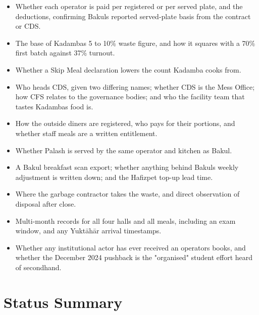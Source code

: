 \documentclass[
  10pt,
  table]{article}
\providecommand{\tightlist}{%
  \setlength{\itemsep}{0pt}\setlength{\parskip}{0pt}}
\renewcommand{\tightlist}{\setlength{\itemsep}{1.5pt}\setlength{\parskip}{0pt}}
\begin{document}
\begin{itemize}
\tightlist
\item
  Whether each operator is paid per registered or per served plate, and the deductions, confirming Bakul\textquotesingle s reported served-plate basis from the contract or CDS.
\item
  The base of Kadamba\textquotesingle s 5 to 10\% waste figure, and how it squares with a 70\% first batch against 37\% turnout.
\item
  Whether a Skip Meal declaration lowers the count Kadamba cooks from.
\item
  Who heads CDS, given two differing names; whether CDS is the Mess Office; how CFS relates to the governance bodies; and who the facility team that tastes Kadamba\textquotesingle s food is.
\item
  How the outside diners are registered, who pays for their portions, and whether staff meals are a written entitlement.
\item
  Whether Palash is served by the same operator and kitchen as Bakul.
\item
  A Bakul breakfast scan export; whether anything behind Bakul\textquotesingle s weekly adjustment is written down; and the Hafizpet top-up lead time.
\item
  Where the garbage contractor takes the waste, and direct observation of disposal after close.
\item
  Multi-month records for all four halls and all meals, including an exam window, and any Yuktāhār arrival timestamps.
\item
  Whether any institutional actor has ever received an operator\textquotesingle s books, and whether the December 2024 pushback is the "organised" student effort heard of secondhand.
\end{itemize}

\section{Status Summary}\label{status-summary}
\end{document}
